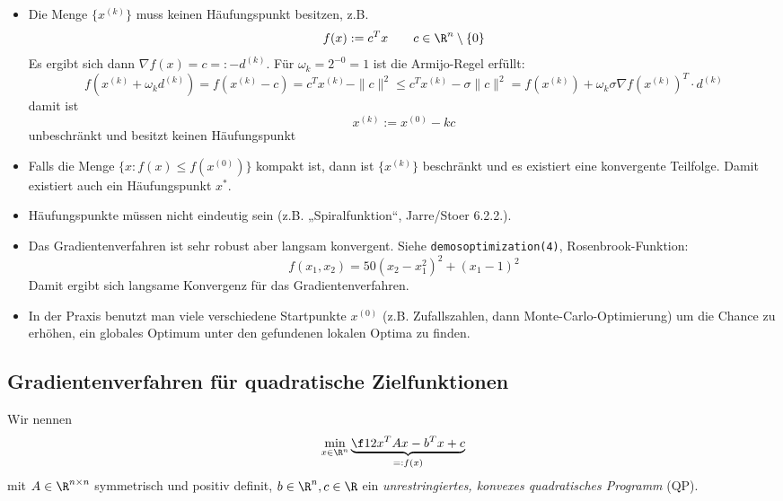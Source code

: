 \documentclass[11pt]{scrbook}
\begin{document}
\begin{st}[Konvergenz]
\begin{note}
\begin{itemize}
			\item
				Die Menge $\{x^{(k)}\}$ muss keinen Häufungspunkt besitzen, z.B.
				\[
					f(x) := c^T x \qquad c \in \R^n \setminus\{0\}
				\]
				Es ergibt sich dann $\nabla f(x) = c =: -d^{(k)}$.
				Für $\omega_k = 2^{-0} = 1$ ist die Armijo-Regel erfüllt:
				\[
					f(x^{(k)} +\omega_k d^{(k)}) = f(x^{(k)} - c) = c^T x^{(k)} - \|c\|^2 \le c^T x^{(k)} - \sigma \|c\|^2 = f(x^{(k)}) + \omega_k \sigma \nabla f(x^{(k)})^T \cdot d^{(k)}
				\]
				damit ist
				\[
					x^{(k)} := x^{(0)} - k c
				\]
				unbeschränkt und besitzt keinen Häufungspunkt
			\item
				Falls die Menge $\{x : f(x) \le f(x^{(0)}) \}$ kompakt ist, dann ist $\{x^{(k)}\}$ beschränkt und es existiert eine konvergente Teilfolge.
				Damit existiert auch ein Häufungspunkt $x^*$.
			\item
				Häufungspunkte müssen nicht eindeutig sein (z.B. „Spiralfunktion“, Jarre/Stoer 6.2.2.).
			\item
				Das Gradientenverfahren ist sehr robust aber langsam konvergent.
				Siehe \texttt{demos\textunderscore optimization(4)}, Rosenbrook-Funktion:
				\[
					f(x_1, x_2) = 50 (x_2-x_1^2)^2 + (x_1-1)^2
				\]
				Damit ergibt sich langsame Konvergenz für das Gradientenverfahren.
			\item
				In der Praxis benutzt man viele verschiedene Startpunkte $x^{(0)}$ (z.B. Zufallszahlen, dann Monte-Carlo-Optimierung) um die Chance zu erhöhen, ein globales Optimum unter den gefundenen lokalen Optima zu finden.
		 \end{itemize}
	 \end{note}
\end{st}


\subsection{Gradientenverfahren für quadratische Zielfunktionen}


\begin{df}[Unrestringiertes QP] \label{4.9}
	Wir nennen
	\[
		\min_{x\in \R^n} \underbrace{\f 12 x^T A x - b^T x + c}_{=:f(x)}
	\]
	mit $A \in \R^{n\times n}$ symmetrisch und positiv definit, $b\in \R^n, c\in \R$ ein
	\emph{unrestringiertes, konvexes quadratisches Programm} (QP).
\end{df}
\end{document}
